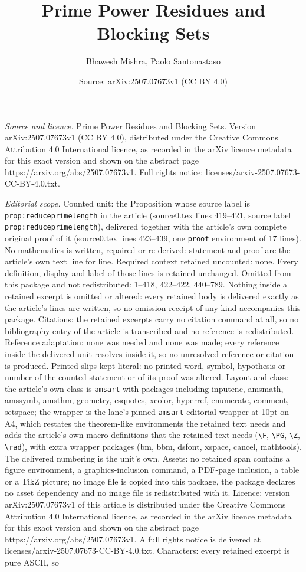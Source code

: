 \documentclass[10pt,a4paper]{amsart}
\title[Prime Power Residues and Blocking Sets]{Prime Power Residues and Blocking Sets}
\author{Bhawesh Mishra, Paolo Santonastaso}
\date{Source: arXiv:2507.07673v1 (CC BY 4.0)}
\begin{document}
\maketitle

\noindent\emph{Source and licence.} Prime Power Residues and Blocking Sets. Version arXiv:2507.07673v1 (CC BY 4.0), distributed under the Creative Commons Attribution 4.0 International licence, as recorded in the arXiv licence metadata for this exact version and shown on the abstract page https://arxiv.org/abs/2507.07673v1. Full rights notice: licenses/arxiv-2507.07673-CC-BY-4.0.txt.\par\smallskip

\noindent\textit{Editorial scope.} Counted unit: the Proposition whose source label is \texttt{prop:reduceprimelength} in the article (source0.tex lines 419--421, source label \texttt{prop:reduceprimelength}), delivered together with the article's own complete original proof of it (source0.tex lines 423--439, one \texttt{proof} environment of 17 lines). No mathematics is written, repaired or re-derived: statement and proof are the article's own text line for line. Required context retained uncounted: none. Every definition, display and label of those lines is retained unchanged. Omitted from this package and not redistributed: 1--418, 422--422, 440--789. Nothing inside a retained excerpt is omitted or altered: every retained body is delivered exactly as the article's lines are written, so no omission receipt of any kind accompanies this package. Citations: the retained excerpts carry no citation command at all, so no bibliography entry of the article is transcribed and no reference is redistributed. Reference adaptation: none was needed and none was made; every reference inside the delivered unit resolves inside it, so no unresolved reference or citation is produced. Printed slips kept literal: no printed word, symbol, hypothesis or number of the counted statement or of its proof was altered. Layout and class: the article's own class is \texttt{amsart} with packages including inputenc, amsmath, amssymb, amsthm, geometry, csquotes, xcolor, hyperref, enumerate, comment, setspace; the wrapper is the lane's pinned \texttt{amsart} editorial wrapper at 10pt on A4, which restates the theorem-like environments the retained text needs and adds the article's own macro definitions that the retained text needs (\texttt{\textbackslash F}, \texttt{\textbackslash PG}, \texttt{\textbackslash Z}, \texttt{\textbackslash rad}), with extra wrapper packages (bm, bbm, dsfont, xspace, cancel, mathtools). The delivered numbering is the unit's own. Assets: no retained span contains a figure environment, a graphics-inclusion command, a PDF-page inclusion, a table or a TikZ picture; no image file is copied into this package, the package declares no asset dependency and no image file is redistributed with it. Licence: version arXiv:2507.07673v1 of this article is distributed under the Creative Commons Attribution 4.0 International licence, as recorded in the arXiv licence metadata for this exact version and shown on the abstract page https://arxiv.org/abs/2507.07673v1. A full rights notice is delivered at licenses/arxiv-2507.07673-CC-BY-4.0.txt. Characters: every retained excerpt is pure ASCII, so 
\end{document}
